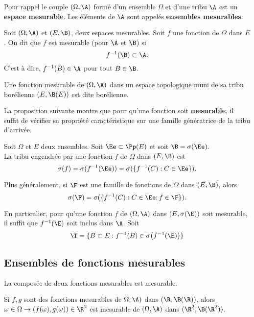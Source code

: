 \bigskip

 Pour rappel le couple $(\Omega, \A)$ formé d'un ensemble $\Omega$ et d'une tribu $\A$ est un \textbf{espace mesurable}. Les éléments de $\A$ sont appelés \textbf{ensembles mesurables}.
\ben
    \item[(i)] Soit $(\Omega, \A)$ et $(E, \B)$, deux espaces mesurables. Soit $f$ une fonction de $\Omega$ dans $E$. On dit que $f$ est mesurable (pour $\A$ et $\B$) si $$f^{-1}(\B) \subset \A.$$ C'est à dire, $f^{-1}(B) \in \A$ pour tout $B \in \B$.
\een
\ed

\bigskip

Une fonction mesurable de $(\Omega, \A)$ dans un espace topologique muni de sa tribu borélienne $(E, \B(E))$ est dite borélienne.
\ed
    
\bigskip

La proposition suivante montre que pour qu'une fonction soit \textbf{mesurable}, il suffit de vérifier sa propriété caractéristique sur une famille génératrice de la tribu d'arrivée.

 Soit $\Omega$ et $E$ deux ensembles. Soit $\Ee \subset \Pp(E)$ et soit $\B = \sigma(\Ee).$\\
La tribu engendrée par une fonction $f$ de $\Omega$ dans $(E, \B)$ est $$\sigma(f) = \sigma(f^{-1}(\Ee)) = \sigma(\{f^{-1}(C) : C \in \Ee\}).$$

Plus généralement, si $\F$ est une famille de fonctions de $\Omega$ dans $(E, \B)$, alors $$\sigma(\F) = \sigma(\{f^{-1}(C) : C \in \Ee ; f \in \F\}).$$

En particulier, pour qu'une fonction $f$ de $(\Omega, \A)$ dans $(E, \sigma(\E))$ soit mesurable, il suffit que $f^{-1}(\E)$ soit inclus dans $\A$.
\ep
 \bpf
 Soit $$\T = \{B \subset E : f^{-1}(B) \in \sigma\big(f^{-1}(\E)\big)\}$$
 \epf
    
\subsection{Ensembles de fonctions mesurables}

\bp
La composée de deux fonctions mesurables est mesurable.
\ep
\bpf

\epf
    
\bl
Si $f,g$ sont des fonctions mesurables de $\Omega, \A)$ dans $(\R, \B(\R))$, alors $\omega \in \Omega \to (f(\omega),g(\omega)) \in \R^2$ est mesurable de $(\Omega, \A)$ dans $(\R^2, \B(\R^2))$.
\el
\bpf
\epf

